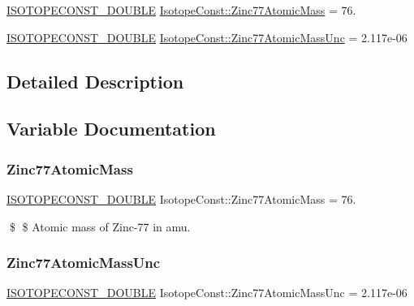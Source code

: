 \begin{DoxyCompactItemize}
\item 
\mbox{\hyperlink{group___isotope_const-_macros_ga8f45a7272ce02c0b4c65c44636ed719a}{I\+S\+O\+T\+O\+P\+E\+C\+O\+N\+S\+T\+\_\+\+D\+O\+U\+B\+LE}} \mbox{\hyperlink{group___isotope_const-_zinc-_zn77_ga2250ddd4c303f2425ba26ae30430af1b}{Isotope\+Const\+::\+Zinc77\+Atomic\+Mass}} = 76.
\item 
\mbox{\hyperlink{group___isotope_const-_macros_ga8f45a7272ce02c0b4c65c44636ed719a}{I\+S\+O\+T\+O\+P\+E\+C\+O\+N\+S\+T\+\_\+\+D\+O\+U\+B\+LE}} \mbox{\hyperlink{group___isotope_const-_zinc-_zn77_ga88337dba7e46a6729a8b78832015c7ba}{Isotope\+Const\+::\+Zinc77\+Atomic\+Mass\+Unc}} = 2.\+117e-\/06
\end{DoxyCompactItemize}


\subsection{Detailed Description}


\subsection{Variable Documentation}
\mbox{\label{group___isotope_const-_zinc-_zn77_ga2250ddd4c303f2425ba26ae30430af1b}} 
\subsubsection{\texorpdfstring{Zinc77\+Atomic\+Mass}{Zinc77AtomicMass}}
{\footnotesize\ttfamily \mbox{\hyperlink{group___isotope_const-_macros_ga8f45a7272ce02c0b4c65c44636ed719a}{I\+S\+O\+T\+O\+P\+E\+C\+O\+N\+S\+T\+\_\+\+D\+O\+U\+B\+LE}} Isotope\+Const\+::\+Zinc77\+Atomic\+Mass = 76.}

\$ \$ Atomic mass of Zinc-\/77 in amu. \mbox{\label{group___isotope_const-_zinc-_zn77_ga88337dba7e46a6729a8b78832015c7ba}} 
\subsubsection{\texorpdfstring{Zinc77\+Atomic\+Mass\+Unc}{Zinc77AtomicMassUnc}}
{\footnotesize\ttfamily \mbox{\hyperlink{group___isotope_const-_macros_ga8f45a7272ce02c0b4c65c44636ed719a}{I\+S\+O\+T\+O\+P\+E\+C\+O\+N\+S\+T\+\_\+\+D\+O\+U\+B\+LE}} Isotope\+Const\+::\+Zinc77\+Atomic\+Mass\+Unc = 2.\+117e-\/06}

